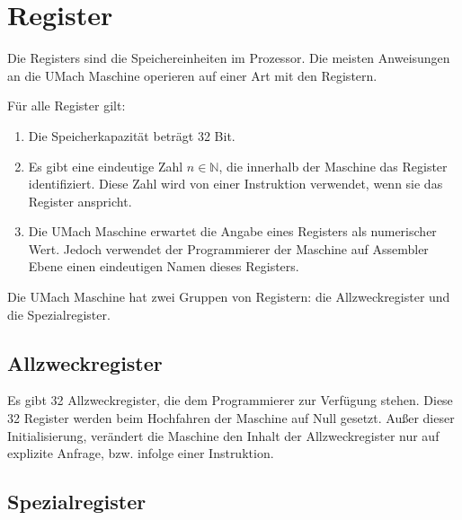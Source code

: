 \section{Register}
\label{sec:Register}

Die \glspl{Register} sind die Speichereinheiten im Prozessor.
Die meisten Anweisungen an die UMach Maschine operieren auf einer Art mit den
Registern.

Für alle Register gilt:
\begin{enumerate}
  \item Die Speicherkapazität beträgt 32 Bit.
  \item Es gibt eine eindeutige Zahl $n \in \mathds{N}$, die innerhalb der
    Maschine das Register identifiziert. Diese Zahl wird von einer Instruktion
    verwendet, wenn sie das Register anspricht.
  \item Die UMach Maschine erwartet die Angabe eines Registers als numerischer
    Wert. Jedoch verwendet der Programmierer der Maschine auf Assembler Ebene
    einen eindeutigen Namen dieses Registers.
\end{enumerate}

Die UMach Maschine hat zwei Gruppen von Registern: die Allzweckregister und
die Spezialregister. 


\subsection{Allzweckregister}
Es gibt 32 Allzweckregister, die dem Programmierer zur Verfügung stehen.
Diese 32 Register werden beim Hochfahren der Maschine auf Null gesetzt. Außer
dieser Initialisierung, verändert die Maschine den Inhalt der Allzweckregister
nur auf explizite Anfrage, bzw. infolge einer Instruktion. 

\subsection{Spezialregister}


